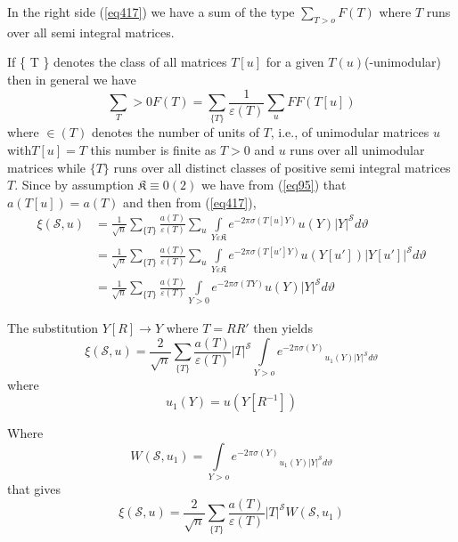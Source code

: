  In the right side (\ref{eq417}) we have a sum of the type $\sum\limits_{T >
   o} F (T)$ where $T$ runs over all semi integral matrices.  
 
 If \{ T \} denotes the class of all matrices $T [u]$ for a given $T
 (u)$\break (-unimodular) then in general we have 
 $$
 \sum_T > 0 F (T) = \sum_{\{T\}} \frac{1}{\varepsilon(T)} \sum_u F F(T
     [u]) 
 $$
 where $\in (T)$ denotes the number of units of $T$, i.e., of
 unimodular matrices $u$ with\pageoriginale $T[u]= T$ this number is
 finite as $T > 
 0$ and $u$ runs over all unimodular matrices while $\{ T\}$ runs
 over all distinct classes of positive semi integral matrices
 $T$. Since by assumption $\mathfrak{K} \equiv 0(2)$ we have from
(\ref{eq95}) that $a (T [u]) = a (T)$ and then from (\ref{eq417}),   
 \begin{align*}
\xi (\mathscr{S}, u) & = \frac{1}{\sqrt{n}} \sum_{\{T\}} \frac{a (T)}
    {\varepsilon (T)} \sum_u \int\limits_{ Y \varepsilon \mathfrak{K}} e
    ^{- 2 \pi \sigma (T [u] Y)} u (Y) |Y|^\mathscr{S} d \vartheta \\ 
& = \frac{1}{\sqrt{n}} \sum_{\{T\}} \frac{a (T)} {\varepsilon (T)}
    \sum_u \int\limits_{ Y \varepsilon \mathfrak{K}} e ^{- 2 \pi \sigma
      (T [u'] Y)} u (Y[u']) |Y[u']|^\mathscr{S} d \vartheta \\ 
& = \frac{1}{\sqrt{n}} \sum_{\{T\}} \frac{a (T)} {\varepsilon (T)}
    \int\limits_{Y > 0}  e^{- 2 \pi \sigma (T Y)} u (Y)
    |Y|^\mathscr{S} d \vartheta 
 \end{align*} 
 
 The substitution $Y [R] \to Y$ where $T = R R'$ then yields 
 \begin{equation*}
\xi (\mathscr{S}, u) = \frac{2}{\sqrt{n}} \sum_{\{ T \}} \frac{a (T)}
    {\varepsilon (T)} |T|^\mathscr{S} \int\limits_{Y > o}e^{- 2 \pi
      \sigma (Y)}{_{u_1 (Y) |Y|^\mathscr{S} d \vartheta}} \tag{418}\label{eq418} 
\end{equation*}
where
$$
u_1 (Y) = u (Y [R^{-1}])
$$

Where
\begin{equation*}
W (\mathscr{S}, u_1) = \int\limits_{ Y > o} e^{- 2 \pi \sigma
  (Y)}{_{u_1 (Y) |Y|^\mathscr{S} d \vartheta}} \tag{419}\label{eq419} 
\end{equation*}
that gives
\begin{equation*}
\xi (\mathscr{S}, u) = \frac{2}{\sqrt{n}} \sum_{\{ T \}} \frac{a (T)}
    {\varepsilon (T)} |T|^\mathscr{S} W (\mathscr{S}, u_1)
    \tag{420}\label{eq420}  
\end{equation*}

